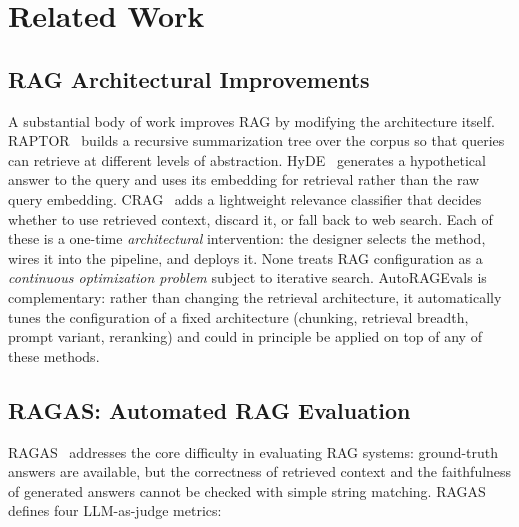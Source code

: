 \documentclass[11pt,a4paper]{article}
\begin{document}
\section{Related Work}

\subsection{RAG Architectural Improvements}

A substantial body of work improves RAG by modifying the architecture itself.
RAPTOR~\cite{sarthi2024raptor} builds a recursive summarization tree over the
corpus so that queries can retrieve at different levels of abstraction.
HyDE~\cite{gao2022precise} generates a hypothetical answer to the query and
uses its embedding for retrieval rather than the raw query embedding.
CRAG~\cite{yan2024corrective} adds a lightweight relevance classifier that
decides whether to use retrieved context, discard it, or fall back to web
search. Each of these is a one-time \emph{architectural} intervention: the
designer selects the method, wires it into the pipeline, and deploys it. None
treats RAG configuration as a \emph{continuous optimization problem} subject
to iterative search. AutoRAGEvals is complementary: rather than changing the
retrieval architecture, it automatically tunes the configuration of a fixed
architecture (chunking, retrieval breadth, prompt variant, reranking) and
could in principle be applied on top of any of these methods.

\subsection{RAGAS: Automated RAG Evaluation}

RAGAS~\cite{es2023ragas} addresses the core difficulty in evaluating RAG
systems: ground-truth answers are available, but the correctness of retrieved
context and the faithfulness of generated answers cannot be checked with simple
string matching. RAGAS defines four LLM-as-judge metrics:
\end{document}
